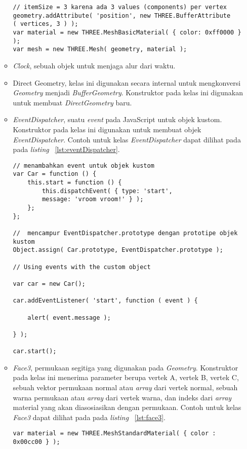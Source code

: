 \begin{itemize}
\begin{itemize}
\begin{lstlisting}[caption={Contoh instansiasi kelas {\it BufferGeometry} dengan membuat bentuk kotak sederhana.}, label={lst:bufferGeo},captionpos=b]
// itemSize = 3 karena ada 3 values (components) per vertex
geometry.addAttribute( 'position', new THREE.BufferAttribute
( vertices, 3 ) );
var material = new THREE.MeshBasicMaterial( { color: 0xff0000 } );
var mesh = new THREE.Mesh( geometry, material );
\end{lstlisting}
		\item{\it Clock}, sebuah objek untuk menjaga alur dari waktu.
		\item{Direct Geometry}, kelas ini digunakan secara internal untuk mengkonversi {\it Geometry} menjadi {\it BufferGeometry}. Konstruktor pada kelas ini digunakan untuk membuat {\it DirectGeometry} baru.
		\item{\it EventDispatcher}, suatu {\it event} pada JavaScript untuk objek kustom. Konstruktor pada kelas ini digunakan untuk membuat objek {\it EventDispatcher}. Contoh untuk kelas {\it EventDispatcher} dapat dilihat pada pada {\it listing} ~\ref{lst:eventDispatcher}.
\begin{lstlisting}[caption={Contoh penggunaan objek {\it EventDispatcher} untuk objek kustom.}, label={lst:eventDispatcher},captionpos=b]
// menambahkan event untuk objek kustom
var Car = function () {
    this.start = function () {
        this.dispatchEvent( { type: 'start',
        message: 'vroom vroom!' } );
    };
};

//  mencampur EventDispatcher.prototype dengan prototipe objek kustom
Object.assign( Car.prototype, EventDispatcher.prototype );

// Using events with the custom object

var car = new Car();

car.addEventListener( 'start', function ( event ) {

    alert( event.message );

} );

car.start();
\end{lstlisting}
		\item{\it Face3}, permukaan segitiga yang digunakan pada {\it Geometry}. Konstruktor pada kelas ini menerima parameter berupa vertek A, vertek B, vertek C, sebuah vektor permukaan normal atau {\it array} dari vertek normal, sebuah warna permukaan atau {\it array} dari vertek warna, dan indeks dari {\it array} material yang akan diasosiasikan dengan permukaan. Contoh untuk kelas {\it Face3} dapat dilihat pada pada {\it listing} ~\ref{lst:face3}.
\begin{lstlisting}[caption={Contoh penggunaan {\it Face3} pada suatu {\it Geometry}.}, label={lst:face3},captionpos=b]
var material = new THREE.MeshStandardMaterial( { color : 0x00cc00 } );


\end{lstlisting}
\end{itemize}
\end{itemize}
